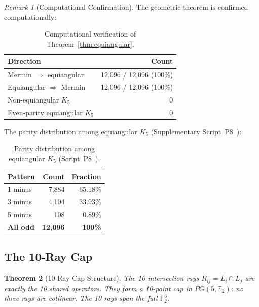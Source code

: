 \documentclass[11pt,a4paper]{article}
\newtheorem{theorem}{Theorem}[section]
\theoremstyle{remark}
\newtheorem{remark}[theorem]{Remark}
\newcommand{\F}{\mathbb{F}}
\begin{document}
\begin{remark}[Computational Confirmation]
The geometric theorem is confirmed computationally:

\begin{table}[h]
\centering
\begin{tabular}{l r}
\toprule
Direction & Count \\
\midrule
Mermin $\Rightarrow$ equiangular & 12{,}096 / 12{,}096 (100\%) \\
Equiangular $\Rightarrow$ Mermin & 12{,}096 / 12{,}096 (100\%) \\
Non-equiangular $K_5$ & 0 \\
Even-parity equiangular $K_5$ & 0 \\
\bottomrule
\end{tabular}
\caption{Computational verification of Theorem~\ref{thm:equiangular}.}
\label{tab:equiangular-verify}
\end{table}

The parity distribution among equiangular $K_5$
(Supplementary Script~P8~\cite{PaperXsuppl}):

\begin{table}[h]
\centering
\begin{tabular}{l r r}
\toprule
Pattern & Count & Fraction \\
\midrule
1 minus & 7{,}884 & 65.18\% \\
3 minus & 4{,}104 & 33.93\% \\
5 minus & 108 & 0.89\% \\
\textbf{All odd} & \textbf{12{,}096} & \textbf{100\%} \\
\bottomrule
\end{tabular}
\caption{Parity distribution among equiangular $K_5$ (Script~P8~\cite{PaperXsuppl}).}
\label{tab:parity-dist}
\end{table}
\end{remark}

\subsection{The 10-Ray Cap}

\begin{theorem}[10-Ray Cap Structure]
\label{thm:cap}
The 10 intersection rays $R_{ij} = L_i \cap L_j$ are exactly the
10 shared operators. They form a \emph{10-point cap} in $PG(5, \F_2)$:
no three rays are collinear. The 10 rays span the full $\F_2^6$.
\end{theorem}
\end{document}
